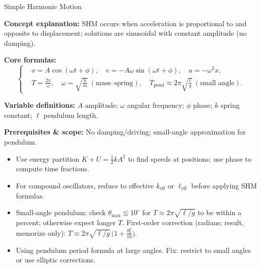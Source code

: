 \label{unit:waves}

\begin{KnowledgePoint}{Simple Harmonic Motion \Core}
  \KPFormulas
  \begin{formulabox}
  \textbf{Concept explanation:} SHM occurs when acceleration is proportional to and opposite to displacement; solutions are sinusoidal with constant amplitude (no damping).

  \textbf{Core formulas:}
  \[
  \left\{\begin{aligned}
    &x=A\cos(\omega t+\phi),\quad v=-A\omega\sin(\omega t+\phi),\quad a=-\omega^2 x,\\
    &T=\frac{2\pi}{\omega},\quad \omega=\sqrt{\frac{k}{m}}\ (\text{mass--spring}),\quad T_{\text{pend}}\approx2\pi\sqrt{\frac{\ell}{g}}\ (\text{small angle}).
  \end{aligned}\right.
  \]

  \textbf{Variable definitions:} $A$ amplitude; $\omega$ angular frequency; $\phi$ phase; $k$ spring constant; $\ell$ pendulum length.

  

  \textbf{Prerequisites \& scope:} No damping/driving; small-angle approximation for pendulum.
  \end{formulabox}

  \KPHeuristics
\begin{heuristicsbox}
  \begin{itemize}[leftmargin=*]
    \item Use energy partition $K+U=\tfrac12kA^2$ to find speeds at positions; use phase to compute time fractions.
    \item For compound oscillators, reduce to effective $k_{\text{eff}}$ or $\ell_{\text{eff}}$ before applying SHM formulas.
    \item Small-angle pendulum: check $\theta_{\max}\lesssim 10^\circ$ for $T\approx2\pi\sqrt{\ell/g}$ to be within a percent; otherwise expect longer $T$. First-order correction (radians; \Extension result, memorize only): $\displaystyle T\approx 2\pi\sqrt{\ell/g}\,\big(1+\tfrac{\theta_0^2}{16}\big)$.
  \end{itemize}
  \vspace{0.4em}
  \begin{itemize}[leftmargin=*]
    \item Using pendulum period formula at large angles. Fix: restrict to small angles or use elliptic corrections.
  \end{itemize}
  \end{heuristicsbox}


\end{KnowledgePoint}
